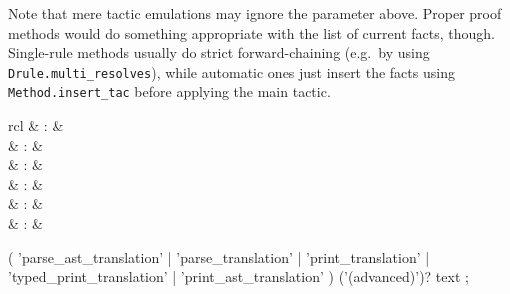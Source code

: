 \begin{isabellebody}
\begin{isamarkuptext}
\begin{descr}
  Note that mere tactic emulations may ignore the 
  parameter above.  Proper proof methods would do something
  appropriate with the list of current facts, though.  Single-rule
  methods usually do strict forward-chaining (e.g.\ by using \verb|Drule.multi_resolves|), while automatic ones just insert the facts
  using \verb|Method.insert_tac| before applying the main tactic.

  \end{descr}%
\end{isamarkuptext}%
\isamarkuptrue%
%
\isamarkuptrue%
%
\begin{isamarkuptext}%
\begin{matharray}{rcl}
    \hypertarget{command.parse-ast-translation}{\hyperlink{command.parse-ast-translation}{\mbox{}}} & : &  \\
    \hypertarget{command.parse-translation}{\hyperlink{command.parse-translation}{\mbox{}}} & : &  \\
    \hypertarget{command.print-translation}{\hyperlink{command.print-translation}{\mbox{}}} & : &  \\
    \hypertarget{command.typed-print-translation}{\hyperlink{command.typed-print-translation}{\mbox{}}} & : &  \\
    \hypertarget{command.print-ast-translation}{\hyperlink{command.print-ast-translation}{\mbox{}}} & : &  \\
    \hypertarget{command.token-translation}{\hyperlink{command.token-translation}{\mbox{}}} & : &  \\
  \end{matharray}

  \begin{rail}
  ( 'parse\_ast\_translation' | 'parse\_translation' | 'print\_translation' |
    'typed\_print\_translation' | 'print\_ast\_translation' ) ('(advanced)')? text
  ;


\end{rail}
\end{isamarkuptext}
\end{isabellebody}
